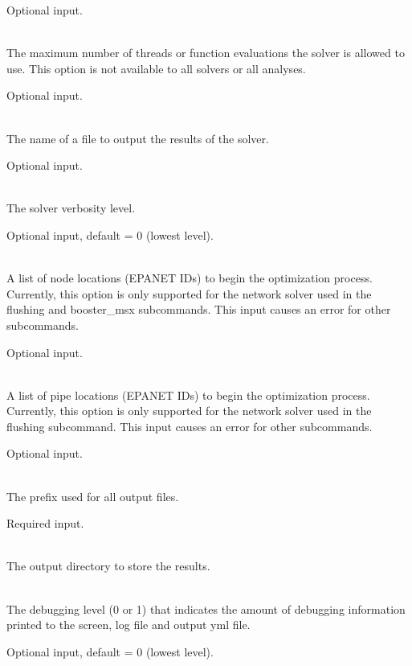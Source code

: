 \begin{description}[topsep=0pt,parsep=0.5em,itemsep=-0.4em]
\begin{description}[topsep=0pt,parsep=0.5em,itemsep=-0.4em]
            Optional input.
    \item[{threads}]\hfill
\\The maximum number of threads or function evaluations the solver is
                allowed to use.  This option is not available to all solvers or all analyses.
                
                Optional input.
    \item[{logfile}]\hfill
\\The name of a file to output the results of the solver.
                
                Optional input.
    \item[{verbose}]\hfill
\\The solver verbosity level.
                
                Optional input, default = 0 (lowest level).
    \item[{initial points}]\hfill
    \begin{description}[topsep=0pt,parsep=0.5em,itemsep=-0.4em]
      \item[{nodes}]\hfill
\\A list of node locations (EPANET IDs) to begin the optimization
        process. Currently, this option is only supported for the
        network solver used in the flushing and booster\_msx
        subcommands. This input causes an error for other subcommands.
        
        Optional input.
      \item[{pipes}]\hfill
\\A list of pipe locations (EPANET IDs) to begin the optimization
        process. Currently, this option is only supported for the
        network solver used in the flushing subcommand. This input causes an error for other subcommands.
        
        Optional input.
    \end{description}
  \end{description}
  \item[{configure}]\hfill
  \begin{description}[topsep=0pt,parsep=0.5em,itemsep=-0.4em]
    \item[{output prefix}]\hfill
\\The prefix used for all output files.
                
                Required input.
    \item[{output directory}]\hfill
      \\The output directory to store the results.
    \item[{debug}]\hfill
\\The debugging level (0 or 1) that indicates the amount of debugging 
                information printed to the screen, log file and output yml file. 
                
                Optional input, default = 0 (lowest level).
  \end{description}
\end{description}
